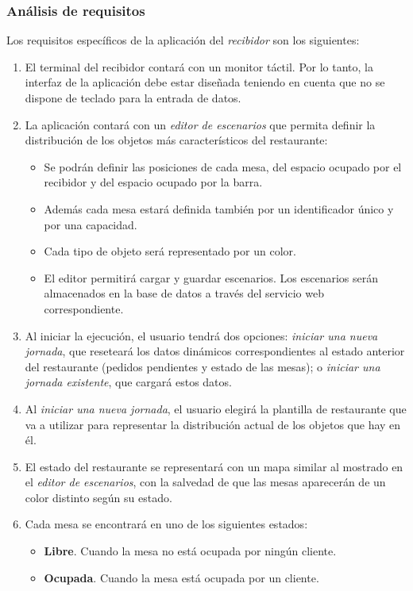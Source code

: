\subsubsection{Análisis de requisitos}
Los requisitos específicos de la aplicación del \emph{recibidor} son los
siguientes:
\begin{enumerate}
\item El terminal del recibidor contará con un monitor táctil. Por lo tanto, la 
interfaz de la aplicación debe estar diseñada teniendo en cuenta que no se
dispone de teclado para la entrada de datos.
\item La aplicación contará con un \emph{editor de escenarios} que permita
definir la distribución de los objetos más característicos del restaurante:
  \begin{itemize}
  \item Se podrán definir las posiciones de cada mesa, del espacio ocupado por
  el recibidor y del espacio ocupado por la barra.
  \item Además cada mesa estará definida también por un identificador único y
  por una capacidad.
  \item Cada tipo de objeto será representado por un color.
  \item El editor permitirá cargar y guardar escenarios. Los escenarios serán
  almacenados en la base de datos a través del servicio web correspondiente.
  \end{itemize}
\item Al iniciar la ejecución, el usuario tendrá dos opciones:
\emph{iniciar una nueva jornada}, que reseteará los datos dinámicos
correspondientes al estado anterior del restaurante (pedidos pendientes y
estado de las mesas); o \emph{iniciar una jornada existente}, que cargará
estos datos.
\item Al \emph{iniciar una nueva jornada}, el usuario elegirá la plantilla de
restaurante que va a utilizar para representar la distribución actual de los
objetos que hay en él.
\item El estado del restaurante se representará con un mapa similar al mostrado
en el \emph{editor de escenarios}, con la salvedad de que las mesas aparecerán
de un color distinto según su estado.
\item Cada mesa se encontrará en uno de los siguientes estados:
  \begin{itemize}
  \item \textbf{Libre}. Cuando la mesa no está ocupada por ningún cliente.
  \item \textbf{Ocupada}. Cuando la mesa está ocupada por un cliente.

\end{itemize}
\end{enumerate}
